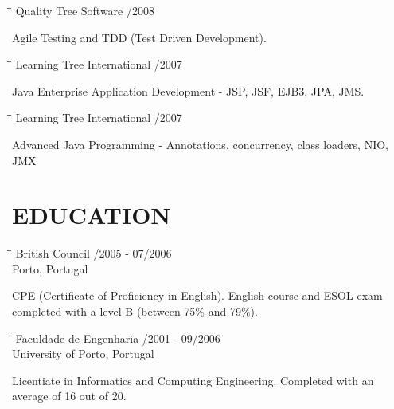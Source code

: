 \documentclass{res}
\begin{document}
\begin{resume}
\begin{tabbing}
\hspace{2.3in}\= \hspace{2.6in}\= \kill %
{\bf } \>Quality Tree Software    
/2008\\ \>
\end{tabbing}\vspace{-20pt}
Agile Testing and TDD (Test Driven Development).

\begin{tabbing}
\hspace{2.3in}\= \hspace{2.6in}\= \kill %
{\bf } \>Learning Tree International    
/2007\\ \>
\end{tabbing}\vspace{-20pt}
Java Enterprise Application Development - JSP, JSF, EJB3, JPA, JMS.

\begin{tabbing}
\hspace{2.3in}\= \hspace{2.6in}\= \kill %
{\bf } \>Learning Tree International    
/2007\\ \>
\end{tabbing}\vspace{-20pt}
Advanced Java Programming - Annotations, concurrency, class loaders, NIO, JMX

\section{EDUCATION}

\begin{tabbing}
\hspace{2.3in}\= \hspace{2.6in}\= \kill %
{\bf } \>British Council
/2005 - 07/2006\\ \>Porto, Portugal
\end{tabbing}\vspace{-20pt}
CPE (Certificate of Proficiency in English).
English course and ESOL exam completed with a level B (between 75\% and 79\%).

\begin{tabbing}
\hspace{2.3in}\= \hspace{2.6in}\= \kill %
{\bf } \>Faculdade de Engenharia
/2001 - 09/2006\\ \>University of Porto, Portugal
\end{tabbing}\vspace{-20pt}
Licentiate in Informatics and Computing Engineering.
Completed with an average of 16 out of 20.

\end{resume}
\end{document}
